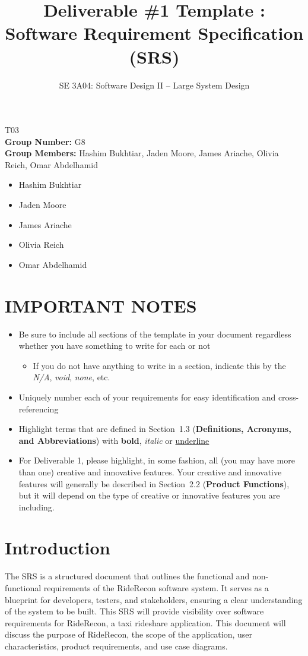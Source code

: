 \documentclass[]{article}
\title{Deliverable \#1 Template : Software Requirement Specification (SRS)}
\author{SE 3A04: Software Design II -- Large System Design}
\date{}
\begin{document}
\maketitle	
{} T03\\
{\bf Group Number:} G8 \\
{\bf Group Members:} Hashim Bukhtiar, Jaden Moore, James Ariache, Olivia Reich, Omar Abdelhamid
\begin{itemize}
        \item Hashim Bukhtiar
        \item Jaden Moore
        \item James Ariache
        \item Olivia Reich
        \item Omar Abdelhamid
\end{itemize}

\section*{IMPORTANT NOTES}
\begin{itemize}
	\item Be sure to include all sections of the template in your document regardless whether you have something to write for each or not
	\begin{itemize}
		\item If you do not have anything to write in a section, indicate this by the \emph{N/A}, \emph{void}, \emph{none}, etc.
	\end{itemize}
	\item Uniquely number each of your requirements for easy identification and cross-referencing
	\item Highlight terms that are defined in Section~1.3 (\textbf{Definitions, Acronyms, and Abbreviations}) with \textbf{bold}, \emph{italic} or \underline{underline}
	\item For Deliverable 1, please highlight, in some fashion, all (you may have more than one) creative and innovative features. Your creative and innovative features will generally be described in Section~2.2 (\textbf{Product Functions}), but it will depend on the type of creative or innovative features you are including.
\end{itemize}

\newpage
\section{Introduction}
\label{sec:introduction}
The SRS is a structured document that outlines the functional and non-functional requirements of the RideRecon software system. It serves as a blueprint for developers, testers, and stakeholders, ensuring a clear understanding of the system to be built. This SRS will provide visibility over software requirements for RideRecon, a taxi rideshare application. 
This document will discuss the purpose of RideRecon, the scope of the application, user characteristics, product requirements, and use case diagrams.
\end{document}
